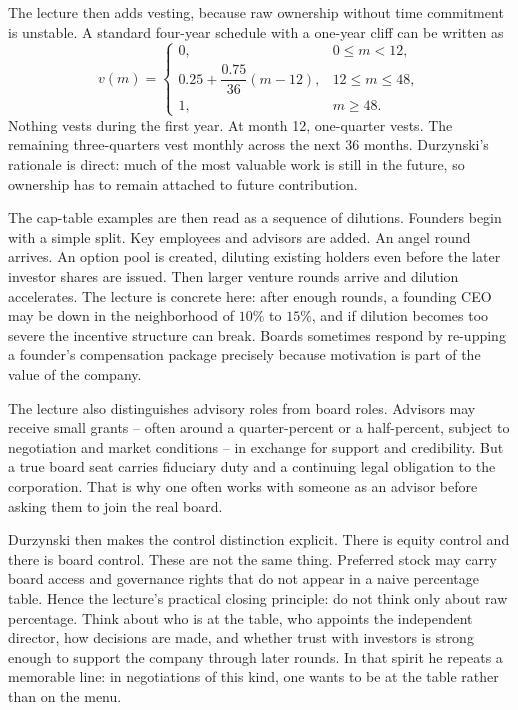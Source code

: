The lecture then adds vesting, because raw ownership without time commitment is unstable. A standard four-year schedule with a one-year cliff can be written as
\begin{equation}
v(m)=
\begin{cases}
0, & 0 \le m < 12, \\
0.25 + \dfrac{0.75}{36}(m-12), & 12 \le m \le 48, \\
1, & m \ge 48.
\end{cases}
\end{equation}
Nothing vests during the first year. At month 12, one-quarter vests. The remaining three-quarters vest monthly across the next 36 months. Durzynski's rationale is direct: much of the most valuable work is still in the future, so ownership has to remain attached to future contribution.

The cap-table examples are then read as a sequence of dilutions. Founders begin with a simple split. Key employees and advisors are added. An angel round arrives. An option pool is created, diluting existing holders even before the later investor shares are issued. Then larger venture rounds arrive and dilution accelerates. The lecture is concrete here: after enough rounds, a founding CEO may be down in the neighborhood of \(10\%\) to \(15\%\), and if dilution becomes too severe the incentive structure can break. Boards sometimes respond by re-upping a founder's compensation package precisely because motivation is part of the value of the company.

The lecture also distinguishes advisory roles from board roles. Advisors may receive small grants -- often around a quarter-percent or a half-percent, subject to negotiation and market conditions -- in exchange for support and credibility. But a true board seat carries fiduciary duty and a continuing legal obligation to the corporation. That is why one often works with someone as an advisor before asking them to join the real board.

Durzynski then makes the control distinction explicit. There is equity control and there is board control. These are not the same thing. Preferred stock may carry board access and governance rights that do not appear in a naive percentage table. Hence the lecture's practical closing principle: do not think only about raw percentage. Think about who is at the table, who appoints the independent director, how decisions are made, and whether trust with investors is strong enough to support the company through later rounds. In that spirit he repeats a memorable line: in negotiations of this kind, one wants to be at the table rather than on the menu.

